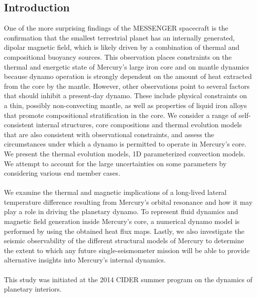 \documentclass[landscape,a0b,final]{a0poster}
\begin{document}
\begin{center}
\begin{minipage}[c][9cm][c]{0.1\textwidth}
\begin{center}
\begin{tabular}{ccc}
    \end{tabular}
  \end{center}
\end{minipage}
\end{center}


\vspace*{1cm}


\begin{multicols}{3}

\section*{Introduction}

One of the more surprising findings of the MESSENGER spacecraft is the confirmation that the smallest terrestrial planet has an internally generated, dipolar magnetic field, which is likely driven by a combination of thermal and compositional buoyancy sources. 
This observation places constraints on the thermal and energetic state of Mercury’s large iron core and on mantle dynamics because dynamo operation is strongly dependent on the amount of heat extracted from the core by the mantle.
However, other observations point to several factors that should inhibit a present-day dynamo. 
These include physical constraints on a thin, possibly non-convecting mantle, as well as properties of liquid iron alloys that promote compositional stratification in the core.
We consider a range of self-consistent internal structures, core compositions and thermal evolution models that are also consistent with observational constraints, and assess the circumstances under which a dynamo is permitted to operate in Mercury’s core. 
We present the thermal evolution models, 1D parameterized convection models. 
We attempt to account for the large uncertainties on some parameters by considering various end member cases.
\\
\\
We examine the thermal and magnetic implications of a long-lived lateral temperature difference resulting from Mercury’s orbital resonance and how it may play a role in driving the planetary dynamo. 
To represent fluid dynamics and magnetic field generation inside Mercury’s core, a numerical dynamo model is performed by using the obtained heat flux maps.
Lastly, we also investigate the seismic observability of the different structural models of Mercury to determine the extent to which any future single-seismometer mission will be able to provide alternative insights into Mercury's internal dynamics.
\\
\\
This study was initiated at the 2014 CIDER summer program on the dynamics of planetary interiors.



\end{multicols}
\end{document}
